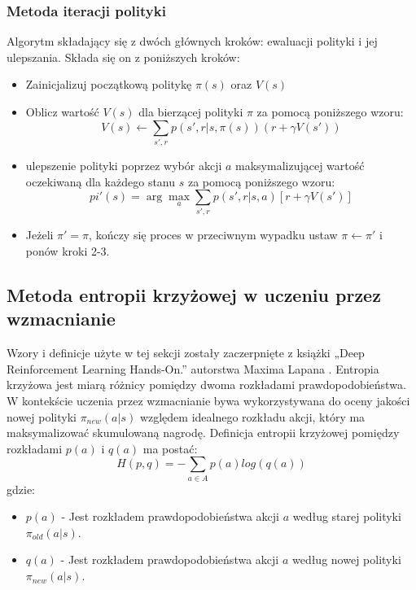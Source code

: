 \documentclass[a4paper, 12pt]{article}
\numberwithin{equation}{section}
\begin{document}
    \subsubsection{Metoda iteracji polityki}
    Algorytm składający się z dwóch głównych kroków: ewaluacji polityki i jej ulepszania. Składa się on z poniższych kroków:
    \begin{itemize} 
        \item Zainicjalizuj początkową politykę \( \pi(s) \) oraz \( V(s) \)
        \item Oblicz wartość \( V(s) \) dla bierzącej polityki \( \pi \) za pomocą poniższego wzoru:
        \begin{equation}
        V(s) \leftarrow \sum_{s',r} p(s',r|s,\pi(s))(r + \gamma V(s'))
        \end{equation}
        \item ulepszenie polityki poprzez wybór akcji \( a \) maksymalizującej wartość oczekiwaną dla każdego stanu \( s \) za pomocą poniższego wzoru:
        \begin{equation}
        pi'(s) = \arg\max_{a} \sum_{s',r} p(s',r|s,a) [r + \gamma V(s')]
        \end{equation}
        \item Jeżeli \( \pi' = \pi \), kończy się proces w przeciwnym wypadku ustaw \( \pi \leftarrow \pi' \) i ponów kroki 2-3.
    \end{itemize}
    \subsection{Metoda entropii krzyżowej w uczeniu przez wzmacnianie}
    Wzory i definicje użyte w tej sekcji zostały zaczerpnięte z książki „Deep Reinforcement Learning Hands-On.” autorstwa Maxima Lapana \cite{lapan2020deep}.
    Entropia krzyżowa jest miarą różnicy pomiędzy dwoma rozkładami prawdopodobieństwa. W kontekście uczenia przez wzmacnianie bywa wykorzystywana do oceny jakości nowej polityki \( \pi_{new} (a|s) \) względem idealnego rozkładu akcji, który ma maksymalizować skumulowaną nagrodę. Definicja entropii krzyżowej pomiędzy rozkładami \( p(a) \) i \( q(a) \) ma postać:
    \begin{equation}
    H(p,q) = - \sum_{a \in A} p(a) log(q(a))
    \end{equation}
    gdzie:
    \begin{itemize}
        \item \( p(a) \) - Jest rozkładem prawdopodobieństwa akcji \( a \) według starej polityki \( \pi_{old}(a|s) \).
        \item \( q(a) \) - Jest rozkładem prawdopodobieństwa akcji \( a \) według nowej polityki \( \pi_{new} (a|s) \).
    \end{itemize} 
\end{document}
